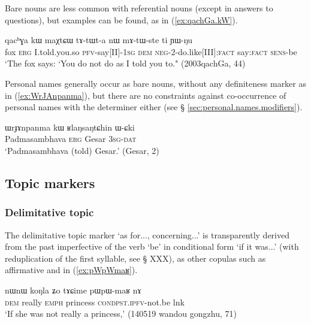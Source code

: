 Bare nouns are less common with referential nouns (except in answers to questions), but examples can be found, as  in (\ref{ex:qachGa.kW}).

\begin{exe}
\ex \label{ex:qachGa.kW}
\gll qacʰɣa 	kɯ maχtɕɯ tɤ-tɯt-a nɯ mɤ-tɯ-ste ti ɲɯ-ŋu \\
fox \textsc{erg} I.told.you.so \textsc{pfv}-say[II]-\textsc{1sg} \textsc{dem} \textsc{neg}-2-do.like[III]:\textsc{fact} say:\textsc{fact} \textsc{sens}-be \\
\glt `The fox says: `You do not do as I told you to." (2003qachGa, 44)
\end{exe}

Personal names generally occur as bare nouns, without any definiteness marker as in (\ref{ex:WrJAnpanma}), but there are no constraints against co-occurrence of personal names with the determiner  either (see § \ref{sec:personal.names.modifiers}).

\begin{exe}
\ex \label{ex:WrJAnpanma}
\gll  ɯrɟɤnpanma kɯ ʁlaŋsaŋtɕhin ɯ-ɕki  \\
 Padmasambhava \textsc{erg} Gesar \textsc{3sg}-\textsc{dat} \\
\glt `Padmasambhava (told) Gesar.' (Gesar, 2)
\end{exe}

 \subsection{Topic markers} \label{sec:topic}
 
  \subsubsection{Delimitative topic} \label{sec:delimitative}
The delimitative topic marker  `as for..., concerning...' is transparently derived from the past imperfective of the verb `be' in conditional form `if it was...' (with reduplication of the first syllable, see § XXX), as other copulas such as affirmative  and  in (\ref{ex:pWpWmaʁ}).

\begin{exe}
\ex \label{ex:pWpWmaʁ}
\gll nɯnɯ koŋla ʑo tɤɕime pɯ\redp{}pɯ-maʁ nɤ \\
\textsc{dem} really \textsc{emph} princess \textsc{cond}\redp{}\textsc{pst.ipfv}-not.be lnk \\
\glt `If she was not really a princess,' (140519 wandou gongzhu, 71)
\end{exe}

